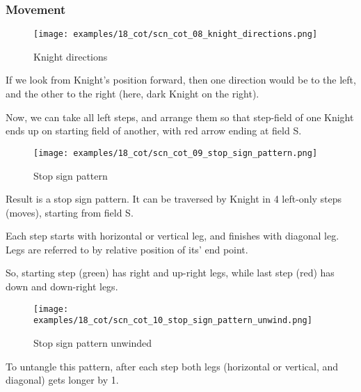 \subsubsection*{Movement}

\noindent
\begin{wrapfigure}[10]{l}{0.4\textwidth}
\centering
\texttt{[image: examples/18\_cot/scn\_cot\_08\_knight\_directions.png]}
\caption{Knight directions}
\label{fig:scn_cot_08_knight_directions}
\end{wrapfigure}
If we look from Knight's position forward, then one direction would be to
the left, and the other to the right (here, dark Knight on the right).

Now, we can take all left steps, and arrange them so that step-field of one
Knight ends up on starting field of another, with red arrow ending at field S.


\vspace*{0.10\textheight}
\noindent
\begin{wrapfigure}[12]{l}{0.4\textwidth}
\centering
\texttt{[image: examples/18\_cot/scn\_cot\_09\_stop\_sign\_pattern.png]}
\caption{Stop sign pattern}
\label{fig:scn_cot_09_stop_sign_pattern}
\end{wrapfigure}
Result is a stop sign pattern. It can be traversed by Knight in 4 left-only
steps (moves), starting from field S.

Each step starts with horizontal or vertical leg, and finishes with diagonal
leg. Legs are referred to by relative position of its' end point.

So, starting step (green) has right and up-right legs, while last step (red)
has down and down-right legs.

\clearpage %

\noindent
\begin{wrapfigure}{l}{0.4\textwidth} %
\centering
\texttt{[image: examples/18\_cot/scn\_cot\_10\_stop\_sign\_pattern\_unwind.png]}
\caption{Stop sign pattern unwinded}
\label{fig:scn_cot_10_stop_sign_pattern_unwind}
\end{wrapfigure}
To untangle this pattern, after each step both legs (horizontal or vertical,
and diagonal) gets longer by 1.

